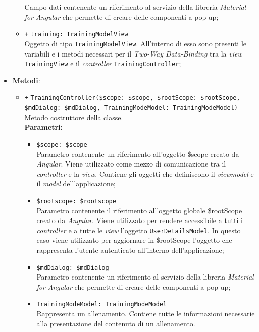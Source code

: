 \begin{itemize}
\begin{itemize}
		Campo dati contenente un riferimento al servizio della libreria \textit{Material for Angular} che permette di creare delle componenti a pop-up;
		\item \texttt{+} \texttt{training: TrainingModelView} \\
		Oggetto di tipo \texttt{TrainingModelView}. All'interno di esso sono presenti le variabili e i metodi necessari per il \textit{Two-Way Data-Binding} tra la \textit{view} \texttt{TrainingView} e il \textit{controller} \texttt{TrainingController};
	\end{itemize}
	\item \textbf{Metodi}:
	\begin{itemize}
		\item \texttt{+} \texttt{TrainingController(\$scope: \$scope, \$rootScope: \$rootScope, \$mdDialog: \$mdDialog, TrainingModeModel: TrainingModeModel)} \\ Metodo costruttore della classe. \\
		\textbf{Parametri:}
		\begin{itemize}
			\item \texttt{\$scope: \$scope} \\
			Parametro contenente un riferimento all'oggetto \$scope creato da \textit{Angular}. Viene utilizzato come mezzo di comunicazione tra il \textit{controller} e la \textit{view}. Contiene gli oggetti che definiscono il \textit{viewmodel} e il \textit{model} dell'applicazione;
			\item \texttt{\$rootscope: \$rootscope}\\
			Parametro contenente il riferimento all'oggetto globale \$rootScope creato da \textit{Angular}. Viene utilizzato per rendere accessibile a tutti i \textit{controller} e a tutte le \textit{view} l'oggetto \texttt{UserDetailsModel}. In questo caso viene utilizzato per aggiornare in \$rootScope l'oggetto che rappresenta l'utente autenticato all'interno dell'applicazione;
			\item \texttt{\$mdDialog: \$mdDialog} \\
			Parametro contenente un riferimento al servizio della libreria \textit{Material for Angular} che permette di creare delle componenti a pop-up;
			\item \texttt{TrainingModeModel: TrainingModeModel} \\ Rappresenta un allenamento. Contiene tutte le informazioni necessarie alla presentazione del contenuto di un allenamento.

\end{itemize}
\end{itemize}
\end{itemize}
